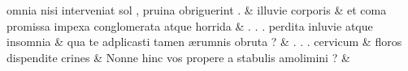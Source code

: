 \documentclass[12pt,onecolumn,twoside,a4paper]{memoir}
\begin{document}
\begin{pairs}
\begin{Leftside}
                              omnia
                              nisi
                              interveniat
                              sol
                              ,
                              pruina
                              obriguerint
                              . \&
                         \stanza {}illuvie
                              corporis & 
                     et
                              coma
                              promissa
                              impexa
                              conglomerata
                              atque
                              horrida \&
                         \stanza {}
                     .
                              .
                              .
                              perdita
                              inluvie
                              atque
                              insomnia \&
                         \stanza {}
                     qua
                              te
                              adplicasti
                              tamen
                              ærumnis
                              obruta
                              ? \&
                         \stanza {}.
                              .
                              .
                              cervicum & 
                     floros
                              dispendite
                              crines \&
                         \stanza {}
                     Nonne
                              hinc
                              vos
                              propere
                              a
                              stabulis
                              amolimini
                              ? \&
                         \stanza {}
                     

\end{Leftside}
\end{pairs}
\end{document}
